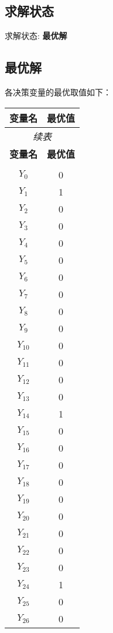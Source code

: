 \documentclass[a4paper,10pt]{article}
\begin{document}
\subsection{求解状态}

求解状态: \textbf{最优解}

\subsection{最优解}

各决策变量的最优取值如下：

\begin{center}
\begin{longtable}{cc}
\toprule
\textbf{变量名} & \textbf{最优值} \\
\midrule
\endfirsthead
\multicolumn{2}{c}{\textit{续表}} \\
\toprule
\textbf{变量名} & \textbf{最优值} \\
\midrule
\endhead
\bottomrule
\endfoot
\bottomrule
\endlastfoot
\multicolumn{2}{c}{\textbf{二元变量}} \\
\midrule
$Y_{0}$ & 0 \\
$Y_{1}$ & 1 \\
$Y_{2}$ & 0 \\
$Y_{3}$ & 0 \\
$Y_{4}$ & 0 \\
$Y_{5}$ & 0 \\
$Y_{6}$ & 0 \\
$Y_{7}$ & 0 \\
$Y_{8}$ & 0 \\
$Y_{9}$ & 0 \\
$Y_{10}$ & 0 \\
$Y_{11}$ & 0 \\
$Y_{12}$ & 0 \\
$Y_{13}$ & 0 \\
$Y_{14}$ & 1 \\
$Y_{15}$ & 0 \\
$Y_{16}$ & 0 \\
$Y_{17}$ & 0 \\
$Y_{18}$ & 0 \\
$Y_{19}$ & 0 \\
$Y_{20}$ & 0 \\
$Y_{21}$ & 0 \\
$Y_{22}$ & 0 \\
$Y_{23}$ & 0 \\
$Y_{24}$ & 1 \\
$Y_{25}$ & 0 \\
$Y_{26}$ & 0 \\

\end{longtable}
\end{center}
\end{document}
